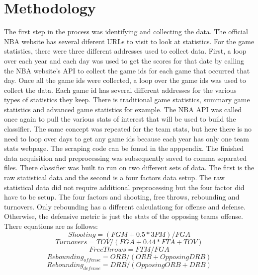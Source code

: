 \documentclass[12pt]{article}%
\begin{document}
\section{Methodology}
The first step in the process was identifying and collecting the data. The official NBA website has several diferent URLs to visit to look at statistics. For the game statistics, there were three different addresses used to collect data. First, a loop over each year and each day was used to get the scores for that date by calling the NBA website's API to collect the game ids for each game that occurred that day. Once all the game ids were collected, a loop over the game ids was used to collect the data. Each game id has several different addresses for the various types of statistics they keep. There is traditional game statistics, summary game statistics and advanced game statistics for example. The NBA API was called once again to pull the various stats of interest that will be used to build the classifier. The same concept was repeated for the team stats, but here there is no need to loop over days to get any game ids because each year has only one team stats webpage. The scraping code can be fonud in the apppendix. The finished data acquisition and preprocessing was subsequently saved to comma separated files.
\newline\newline
There classifier was built to run on two different sets of data. The first is the raw statistical data and the second is a four factors data setup. The raw statistical data did not require additional preprocessing but the four factor did have to be setup. The four factors and shooting, free throws, rebounding and turnovers. Only rebounding has a different calculationg for offense and defense. Otherwise, the defensive metric is just the stats of the opposing teams offense. There equations are as follows:
\begin{equation} Shooting = (FGM + 0.5 * 3PM) / FGA \end{equation}
\begin{equation} Turnovers = TOV / (FGA + 0.44 * FTA +TOV) \end{equation}
\begin{equation} Free Throws = FTM / FGA\end{equation}
\begin{equation} Rebounding_{offense} = ORB / (ORB + OpposingDRB) \end{equation}
\begin{equation} Rebounding_{defense} = DRB / (OpposingORB + DRB) \end{equation}
\end{document}

